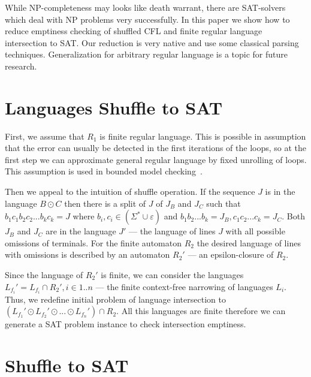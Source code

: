 While NP-completeness may looks like death warrant, there are SAT-solvers which deal with NP problems very successfully.
In this paper we show how to reduce emptiness checking of shuffled CFL and finite regular language intersection to SAT.
Our reduction is very native and use some classical parsing techniques.
Generalization for arbitrary regular language is a topic for future research.


\section{Languages Shuffle to SAT}

First, we assume that $ R_1 $ is finite regular language.
This is possible in assumption that the error can usually be detected in the first iterations of the loops, so at the first step we can approximate general regular language by fixed unrolling of loops.
This assumption is used in bounded model checking~\cite{BMC}.%

Then we appeal to the intuition of shuffle operation.
If the sequence $J$ is in the language $B \odot C$ then there is a split of $J$ of $J_B$ and $J_C$ such that $b_1 c_1 b_2 c_2 ... b_k c_k = J$ where $b_i, c_i \in (\Sigma^* \cup \varepsilon)$
and $b_1 b_2 ... b_k = J_B, c_1 c_2 ... c_k = J_C$.
Both $J_B$ and $J_C$ are in the language $J'$ --- the language of lines $J$ with all possible omissions of terminals.
For the finite automaton $R_2$ the desired language of lines with omissions is described by an automaton $R_2'$ --- an epsilon-closure of $ R_2 $.

Since the language of $R_2'$ is finite, we can consider the languages
$ L_{f_i}' = L_{f_i} \cap R_2', i \in 1..n$ --- the finite context-free narrowing of languages $ L_{i}$.
Thus, we redefine initial problem of language intersection to $(L_{f_1}' \odot L_{f_2}' \odot... \odot L_{f_n}')\cap R_2$.
All this languages are finite therefore we can generate a SAT problem instance to check intersection emptiness.

\section{Shuffle to SAT}


